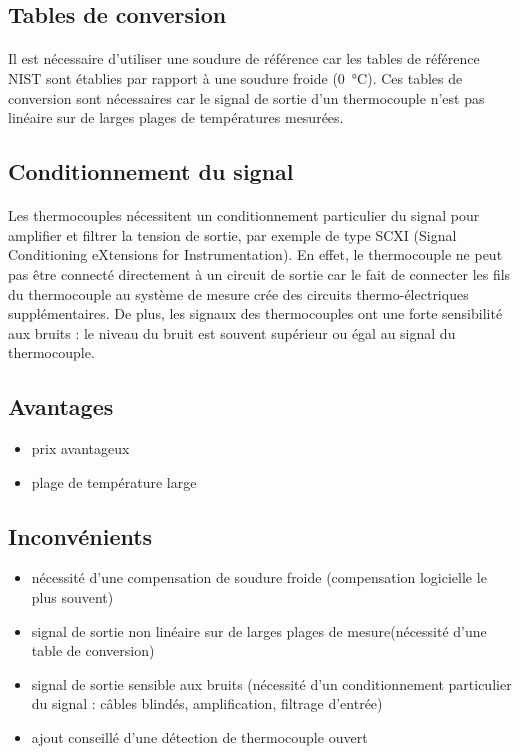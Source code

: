 \documentclass{article}
\begin{document}
\subsection{Tables de conversion}
\paragraph{}
Il est nécessaire d'utiliser une soudure de référence car les tables de référence NIST sont établies par rapport à une soudure froide (\SI{0}{\celsius}). Ces tables de conversion sont nécessaires car le signal de sortie d'un thermocouple n'est pas linéaire sur de larges plages de températures mesurées.


\subsection{Conditionnement du signal}
\paragraph{}
Les thermocouples nécessitent un conditionnement particulier du signal pour amplifier et filtrer la tension de sortie, par exemple de type SCXI (Signal Conditioning eXtensions for Instrumentation). En effet, le thermocouple ne peut pas être connecté directement à un circuit de sortie car le fait de connecter les fils du thermocouple au système de
mesure crée des circuits thermo-électriques supplémentaires. De plus, les signaux des thermocouples ont une forte sensibilité aux bruits : le niveau du bruit est souvent supérieur ou égal au signal du thermocouple.

\subsection{Avantages}
\begin{itemize}
    \item prix avantageux
    \item plage de température large
\end{itemize}

\subsection{Inconvénients}
\begin{itemize}
    \item nécessité d'une compensation de soudure froide (compensation logicielle le plus souvent)
    \item signal de sortie non linéaire sur de larges plages de mesure(nécessité d'une table de conversion)
    \item signal de sortie sensible aux bruits (nécessité d'un conditionnement particulier du signal : câbles blindés, amplification, filtrage d'entrée)
    \item ajout conseillé d'une détection de thermocouple ouvert
\end{itemize}
\end{document}
